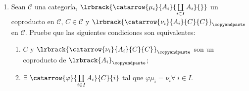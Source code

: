 \documentclass{article}
\begin{document}
\begin{enumerate}[label=\textbf{Ej \arabic*.}]
\begin{proof}
Definimos $\beta:\displaystyle\sum_{i\in I}A_i\longrightarrow B$ como $\beta(x)=\displaystyle\sum_{k=1}^n\beta_{i_k}(x_{i_k})$.\\

Como $\beta_{i_k}$ es morfismo $\forall i_k\in I$ entonces $\beta$ es morfismo de $R$-módulos. Además, $\forall i\in I$, si $x\in A_i$, se tiene que
$\beta\mu_i(x)=\beta(x)=\beta_i(x)$, por lo que $\beta\mu_i=\beta_i\quad \forall i\in I$.\\

Mas aún, si $\gamma:\displaystyle\sum_{i\in I}A_i\longrightarrow B$ es un morfismo tal que $\gamma\mu_i=\beta_i\quad \forall i\in I$, 
entonces, si $x\in \displaystyle\sum_{i\in I}A_i$ (y usando la descripción de la "$x$" que usamos anteriormente), 

\begin{align*}
\gamma(x)&=\gamma\left(\displaystyle\sum_{k=1}^nx_{i_k}\right)=\displaystyle\sum_{k=1}^n\gamma(x_{i_k})\\
&=\displaystyle\sum_{k=1}^n\gamma\mu_{i_k}(x_{i_k})=\displaystyle\sum_{k=1}^n\beta_{i_k}(x_{i_k})\\
&=\displaystyle\sum_{k=1}^n\beta\mu_{i_k}(x_{i_k})=\displaystyle\sum_{k=1}^n\beta(x_{i_k})\\
&=\beta\displaystyle\sum_{k=1}^n(x_{i_k})=\beta(x).
\end{align*}
Por lo que $\beta$ es única, y así $\displaystyle\sum_{i\in I}A_i$ es un coproducto.
\end{proof}


\item Sean $\mathscr{C}$ una categoría, $\lrbrack{\catarrow{\mu_i}{A_i}{\coprod\limits_{i\in I}A_i}{}}$ un coproducto en $\mathscr{C}$,
$C\in\mathscr{C}$ y $\lrbrack{\catarrow{\nu_i}{A_i}{C}{C}}_{\copyandpaste}$ en $\mathscr{C}$. Pruebe que las siguientes condiciones 
son equivalentes:
\begin{enumerate}[label=\textit{\alph*)}]
	\item $C$ y $\lrbrack{\catarrow{\nu_i}{A_i}{C}{C}}_{\copyandpaste}$ son un coproducto de $\lrbrack{A_i}_{\copyandpaste}$;
	\item $\exists\ \catarrow{\varphi}{\coprod\limits_{i\in I}A_i}{C}{i}$ tal que  $\varphi\mu_i=\nu_i$\quad $\forall\ i\in I$.
\end{enumerate}
\end{enumerate}		
\end{document}

